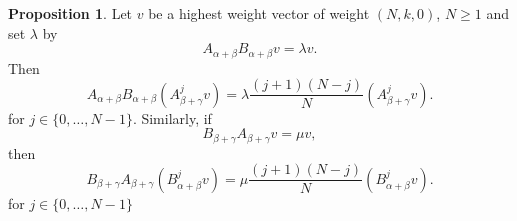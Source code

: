\documentclass[twoside,a4paper,12pt]{article}
\theoremstyle{definition}
\newtheorem{proposition}{Proposition}
\begin{document}
\begin{proposition}\label{coefabbc}
	Let $v$ be a highest weight vector of weight $(N,k,0)$, $N\geq1$
	and set $\lambda$ by
	\begin{equation*}
		A_{\alpha+\beta}B_{\alpha+\beta}v=\lambda v.
	\end{equation*}
	Then
	\begin{equation*}\label{abj}
		A_{\alpha+\beta}B_{\alpha+\beta}(A_{\beta+\gamma}^jv)=
		\lambda\frac{(j+1)(N-j)}N(A_{\beta+\gamma}^jv).
	\end{equation*}
	for $j\in\{0,\ldots,N-1\}$. Similarly, if
	\begin{equation*}
		B_{\beta+\gamma}A_{\beta+\gamma}v=\mu v,
	\end{equation*}
	then
	\begin{equation}\label{baj}
		B_{\beta+\gamma}A_{\beta+\gamma}(B_{\alpha+\beta}^jv)=
		\mu\frac{(j+1)(N-j)}N(B_{\alpha+\beta}^jv).
	\end{equation}
	for $j\in\{0,\ldots,N-1\}$
\end{proposition}
\end{document}
